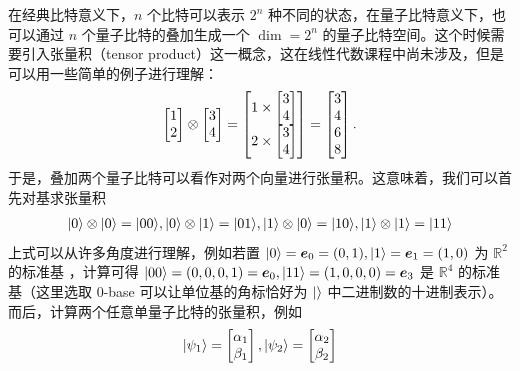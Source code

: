 在经典比特意义下，$n$ 个比特可以表示 $2^n$ 种不同的状态，在量子比特意义下，也可以通过 $n$ 个量子比特的叠加生成一个 $\dim=2^n$ 的量子比特空间。这个时候需要引入张量积（tensor product）这一概念，这在线性代数课程中尚未涉及，但是可以用一些简单的例子进行理解： \begin{align*}
    \begin{bmatrix}
        1 \\2
    \end{bmatrix}
    \otimes
    \begin{bmatrix}
        3 \\4
    \end{bmatrix}
    =
    \begin{bmatrix}
        1\times \begin{bmatrix}
                    3 \\4
                \end{bmatrix} \\
        2\times \begin{bmatrix}
                    3 \\4
                \end{bmatrix}
    \end{bmatrix}
    =
    \begin{bmatrix}
        3 \\4 \\6 \\8
    \end{bmatrix}.
\end{align*}
于是，叠加两个量子比特可以看作对两个向量进行张量积。这意味着，我们可以首先对基求张量积 \begin{align*}
    |0\rangle\otimes|0\rangle=|00\rangle,|0\rangle\otimes|1\rangle=|01\rangle,|1\rangle\otimes|0\rangle=|10\rangle,|1\rangle\otimes|1\rangle=|11\rangle
\end{align*}
上式可以从许多角度进行理解，例如若置 $|0\rangle=\bm{e}_0=(0,1),|1\rangle=\bm{e}_1=(1,0)$ 为 $\mathbb{R}^2$ 的标准基 ，计算可得 $|00\rangle=(0,0,0,1)=\bm{e}_0,|11\rangle=(1,0,0,0)=\bm{e}_3$ 是 $\mathbb{R}^4$ 的标准基（这里选取 0-base 可以让单位基的角标恰好为 $|\rangle$ 中二进制数的十进制表示）。而后，计算两个任意单量子比特的张量积，例如
\begin{align}\begin{aligned}
        |\psi_1\rangle=\begin{bmatrix}
                         \alpha_1 \\\beta_1
                     \end{bmatrix},
        |\psi_2\rangle=\begin{bmatrix}
                         \alpha_2 \\\beta_2
                     \end{bmatrix}
    \end{aligned}\end{align}
